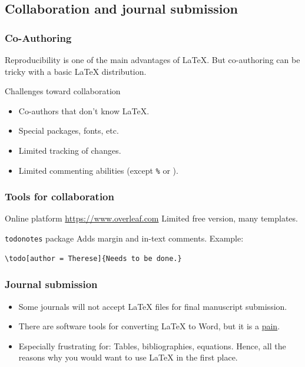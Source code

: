 \documentclass{beamer} %
\begin{document}
\subsection{Collaboration and journal submission}

\begin{frame}
\frametitle{Co-Authoring}
Reproducibility is one of the main advantages of {\LaTeX}. But co-authoring can be tricky with a basic {\LaTeX} distribution.
\begin{block}{Challenges toward collaboration}%
\begin{itemize}
\item Co-authors that don't know {\LaTeX}.
\item Special packages, fonts, etc. 
\item Limited tracking of changes.
\item Limited commenting abilities (except \texttt{\%} or ).
\end{itemize}
\end{block}
\end{frame} 
 
\begin{frame}[fragile]
\frametitle{Tools for collaboration}
 \begin{block}{Online platform \url{https://www.overleaf.com}}%
Limited free version, many templates.
\end{block}\pause
\begin{block}{\texttt{todonotes} package}
Adds margin and in-text comments. Example:
\begin{verbatim}
\todo[author = Therese]{Needs to be done.}
\end{verbatim}
\end{block}
\end{frame}


\begin{frame}
\frametitle{Journal submission}
\begin{itemize}
\item Some journals will not accept {\LaTeX} files for final manuscript submission. 
\item There are software tools for converting {\LaTeX} to Word, but it is a \underline{pain}.
\item Especially frustrating for: Tables, bibliographies, equations. Hence, all the reasons why you would want to use {\LaTeX} in the first place.
\end{itemize}
\end{frame}
\end{document}

